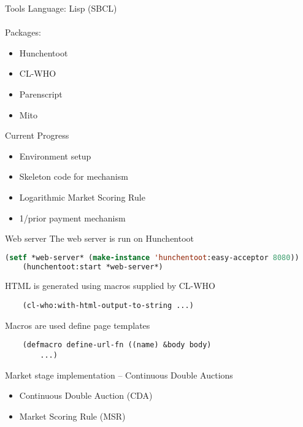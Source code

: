 \documentclass[9pt]{beamer}
\begin{document}
\begin{frame}{Tools}
    Language: Lisp (SBCL) \\~\\
    
    Packages:
    \begin{itemize}
        \item Hunchentoot
        \item CL-WHO
        \item Parenscript
        \item Mito
    \end{itemize}
\end{frame}

\begin{frame}{Current Progress}
    \begin{itemize}
        \item Environment setup
        \item Skeleton code for mechanism
        \item Logarithmic Market Scoring Rule
        \item 1/prior payment mechanism
    \end{itemize}
\end{frame}

\begin{frame}[fragile]{Web server}
    The web server is run on Hunchentoot
    \begin{lstlisting}[language=Lisp]
    (setf *web-server* (make-instance 'hunchentoot:easy-acceptor 8080))
    (hunchentoot:start *web-server*)
    \end{lstlisting}
    
    HTML is generated using macros supplied by CL-WHO
    \begin{lstlisting}
    (cl-who:with-html-output-to-string ...)
    \end{lstlisting}
    
    Macros are used define page templates
    \begin{lstlisting}
    (defmacro define-url-fn ((name) &body body)
        ...)
    \end{lstlisting}
\end{frame}

\begin{frame}{Market stage implementation -- Continuous Double Auctions}
    \begin{itemize}
        \item<2-> Continuous Double Auction (CDA)
        \item<3-> Market Scoring Rule (MSR)
    \end{itemize}~\\
    
\end{frame}
\end{document}
